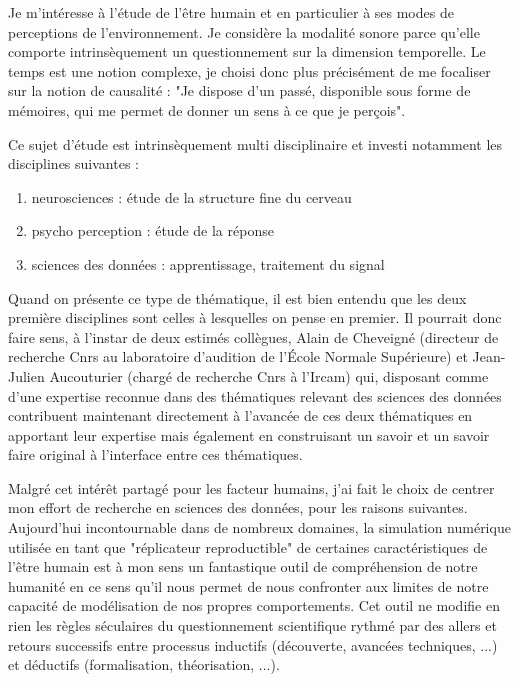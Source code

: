 Je m'intéresse à l'étude de l'être humain et en particulier à ses modes de perceptions de l'environnement. Je considère la modalité sonore parce qu'elle comporte intrinsèquement un questionnement sur la dimension temporelle. Le temps est une notion complexe, je choisi donc plus précisément de me focaliser sur la notion de causalité : "Je dispose d'un passé, disponible sous forme de mémoires, qui me permet de donner un sens à ce que je perçois".

Ce sujet d'étude est intrinsèquement multi disciplinaire et investi notamment les disciplines suivantes :
\begin{enumerate}
  \item neurosciences : étude de la structure fine du cerveau
  \item psycho perception : étude de la réponse
  \item sciences des données : apprentissage, traitement du signal
\end{enumerate}

Quand on présente  ce type de thématique, il est bien entendu que les deux première disciplines sont  celles à lesquelles on pense en premier. Il pourrait donc faire sens, à l'instar de deux estimés collègues, Alain de Cheveigné (directeur de recherche Cnrs au laboratoire d'audition de l'\'Ecole Normale Supérieure) et Jean-Julien Aucouturier (chargé de recherche Cnrs à l'Ircam) qui, disposant comme d'une expertise reconnue dans des thématiques relevant des sciences des données contribuent maintenant directement à l'avancée de ces deux thématiques en apportant leur expertise mais également en construisant un savoir et un savoir faire original à l'interface entre ces thématiques.

Malgré cet intérêt partagé pour les facteur humains, j'ai fait le choix de centrer mon effort de recherche en sciences des données, pour les raisons suivantes. Aujourd'hui incontournable dans de nombreux domaines, la simulation numérique utilisée en tant que "réplicateur reproductible" de certaines caractéristiques de l'être humain est à mon sens un fantastique outil de compréhension de notre humanité en ce sens qu'il nous permet de nous confronter aux limites de notre capacité de modélisation de nos propres comportements. Cet outil ne modifie en rien les règles séculaires du questionnement scientifique rythmé par des allers et retours successifs entre processus inductifs (découverte, avancées techniques, ...) et déductifs (formalisation, théorisation, ...).

